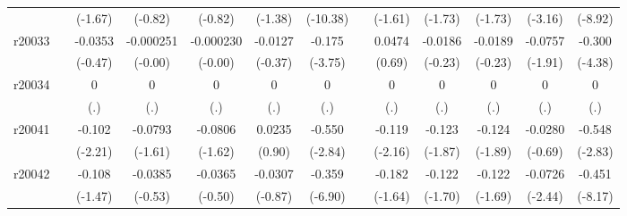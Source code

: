 {\begin{tabular}{l*{12}{c}}
            &                     &     (-1.67)         &     (-0.82)         &     (-0.82)         &     (-1.38)         &    (-10.38)         &                     &     (-1.61)         &     (-1.73)         &     (-1.73)         &     (-3.16)         &     (-8.92)         \\
[1em]
r20033      &                     &     -0.0353         &   -0.000251         &   -0.000230         &     -0.0127         &      -0.175\sym{***}&                     &      0.0474         &     -0.0186         &     -0.0189         &     -0.0757         &      -0.300\sym{***}\\
            &                     &     (-0.47)         &     (-0.00)         &     (-0.00)         &     (-0.37)         &     (-3.75)         &                     &      (0.69)         &     (-0.23)         &     (-0.23)         &     (-1.91)         &     (-4.38)         \\
[1em]
r20034      &                     &           0         &           0         &           0         &           0         &           0         &                     &           0         &           0         &           0         &           0         &           0         \\
            &                     &         (.)         &         (.)         &         (.)         &         (.)         &         (.)         &                     &         (.)         &         (.)         &         (.)         &         (.)         &         (.)         \\
[1em]
r20041      &                     &      -0.102\sym{*}  &     -0.0793         &     -0.0806         &      0.0235         &      -0.550\sym{**} &                     &      -0.119\sym{*}  &      -0.123         &      -0.124         &     -0.0280         &      -0.548\sym{**} \\
            &                     &     (-2.21)         &     (-1.61)         &     (-1.62)         &      (0.90)         &     (-2.84)         &                     &     (-2.16)         &     (-1.87)         &     (-1.89)         &     (-0.69)         &     (-2.83)         \\
[1em]
r20042      &                     &      -0.108         &     -0.0385         &     -0.0365         &     -0.0307         &      -0.359\sym{***}&                     &      -0.182         &      -0.122         &      -0.122         &     -0.0726\sym{*}  &      -0.451\sym{***}\\
            &                     &     (-1.47)         &     (-0.53)         &     (-0.50)         &     (-0.87)         &     (-6.90)         &                     &     (-1.64)         &     (-1.70)         &     (-1.69)         &     (-2.44)         &     (-8.17)         \\

\end{tabular}}
